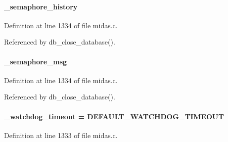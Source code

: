 \paragraph[{\_\-semaphore\_\-history}]{ {\bf \_\-semaphore\_\-history}}\hfill\label{group__midasincludecode_gad5f0535faea28eca82ad7ea08d10fcff}


Definition at line 1334 of file midas.c.

Referenced by db\_\-close\_\-database().
\paragraph[{\_\-semaphore\_\-msg}]{ {\bf \_\-semaphore\_\-msg}}\hfill\label{group__midasincludecode_ga2ae419baee80eaba3ed5308e915732e9}


Definition at line 1334 of file midas.c.

Referenced by db\_\-close\_\-database().
\paragraph[{\_\-watchdog\_\-timeout}]{ {\bf \_\-watchdog\_\-timeout} = DEFAULT\_\-WATCHDOG\_\-TIMEOUT}\hfill\label{group__midasincludecode_ga8bee1d68996452af15659f6a5ccbcab7}


Definition at line 1333 of file midas.c.